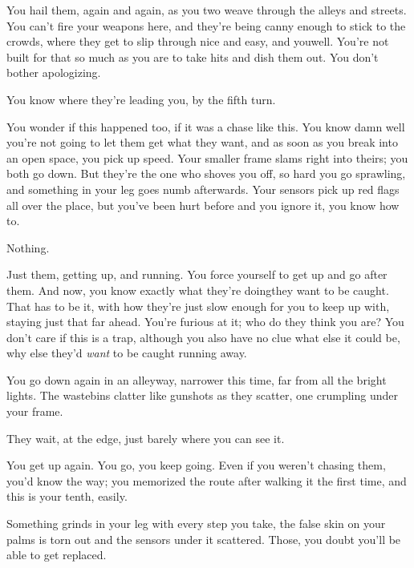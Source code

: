 
You hail them, again and again, as you two weave through the alleys and streets. You can't fire your weapons here, and they're being canny enough to stick to the crowds, where they get to slip through nice and easy, and you\textellipsis well. You're not built for that so much as you are to take hits and dish them out. You don't bother apologizing.

You know where they're leading you, by the fifth turn. 

You wonder if this happened too, if it was a chase like this. You know damn well you're not going to let them get what they want, and as soon as you break into an open space, you pick up speed. Your smaller frame slams right into theirs; you both go down. But they're the one who shoves you off, so hard you go sprawling, and something in your leg goes numb afterwards. Your sensors pick up red flags all over the place, but you've been hurt before and you ignore it, you know how to.


Nothing.

Just them, getting up, and running. You force yourself to get up and go after them. And now, you know exactly what they're doing\textemdash they want to be caught. That has to be it, with how they're just slow enough for you to keep up with, staying just that far ahead. You're furious at it; who do they think you are? You don't care if this is a trap, although you also have no clue what else it could be, why else they'd \emph{want} to be caught running away.

You go down again in an alleyway, narrower this time, far from all the bright lights. The wastebins clatter like gunshots as they scatter, one crumpling under your frame. 

They wait, at the edge, just barely where you can see it.

You get up again. You go, you keep going. Even if you weren't chasing them, you'd know the way; you memorized the route after walking it the first time, and this is your tenth, easily. 

Something grinds in your leg with every step you take, the false skin on your palms is torn out and the sensors under it scattered. Those, you doubt you'll be able to get replaced. 

